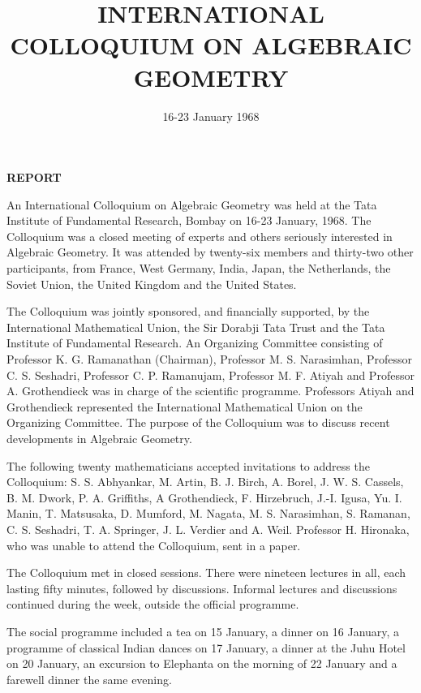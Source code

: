 \title{INTERNATIONAL COLLOQUIUM ON ALGEBRAIC GEOMETRY}

\author{}

\date{16-23 January 1968}

\maketitle

\setcounter{page}{4}

\begin{center}
{\LARGE\bf REPORT}
\end{center}

An International Colloquium on Algebraic Geometry was held at the Tata Institute of Fundamental Research, Bombay on 16-23 January, 1968. The Colloquium was a closed meeting of experts and others seriously interested in Algebraic Geometry. It was attended by twenty-six members and thirty-two other participants, from France, West Germany, India, Japan, the Netherlands, the Soviet Union, the United Kingdom and the United States.

The Colloquium was jointly sponsored, and financially supported, by the International Mathematical Union, the Sir Dorabji Tata Trust and the Tata Institute of Fundamental Research. An Organizing Committee consisting of Professor K. G. Ramanathan (Chairman), Professor M. S. Narasimhan, Professor C. S. Seshadri, Professor C. P. Ramanujam, Professor M. F. Atiyah and Professor A. Grothendieck was in charge of the scientific programme. Professors Atiyah and Grothendieck represented the International Mathematical Union on the Organizing Committee. The purpose of the Colloquium was to discuss recent developments in Algebraic Geometry.

The following twenty mathematicians accepted invitations to address the Colloquium: S. S. Abhyankar, M. Artin, B. J. Birch, A. Borel, J. W. S. Cassels, B. M. Dwork, P. A. Griffiths, A Grothendieck, F. Hirzebruch, J.-I. Igusa, Yu. I. Manin, T. Matsusaka, D. Mumford, M. Nagata, M. S. Narasimhan, S. Ramanan, C. S. Seshadri, T. A. Springer, J. L. Verdier and A. Weil. Professor H. Hironaka, who was unable to attend the Colloquium, sent in a paper.

The Colloquium met in closed sessions. There were nineteen lectures in all, each lasting fifty minutes, followed by discussions. Informal lectures and discussions continued during the week, outside the official programme.

The social programme included a tea on 15 January, a dinner on 16 January, a programme of classical Indian dances on 17 January, a dinner at the Juhu Hotel on 20 January, an excursion to Elephanta  on the morning of 22 January and a farewell dinner the same evening.

 

